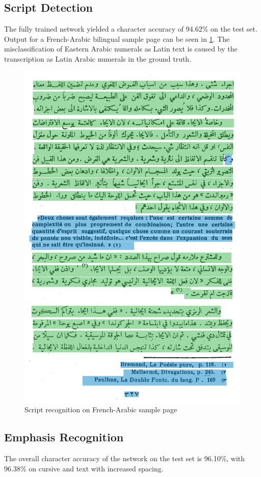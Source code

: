 \subsection{Script Detection}

The fully trained network yielded a character accuracy of 94.62\% on the
test set. Output for a French-Arabic bilingual sample page can be seen in
\ref{fig:high}. The misclassification of Eastern Arabic numerals as Latin text
is caused by the transcription as Latin Arabic numerals in the ground truth.

\begin{figure}
	\includegraphics[width=\columnwidth]{high.png}
	\caption{Script recognition on French-Arabic sample page}
	\label{fig:high}
\end{figure}

\subsection{Emphasis Recognition}

The overall character accuracy of the network on the test set is 96.10\%, with
96.38\% on cursive and text with increased spacing.
